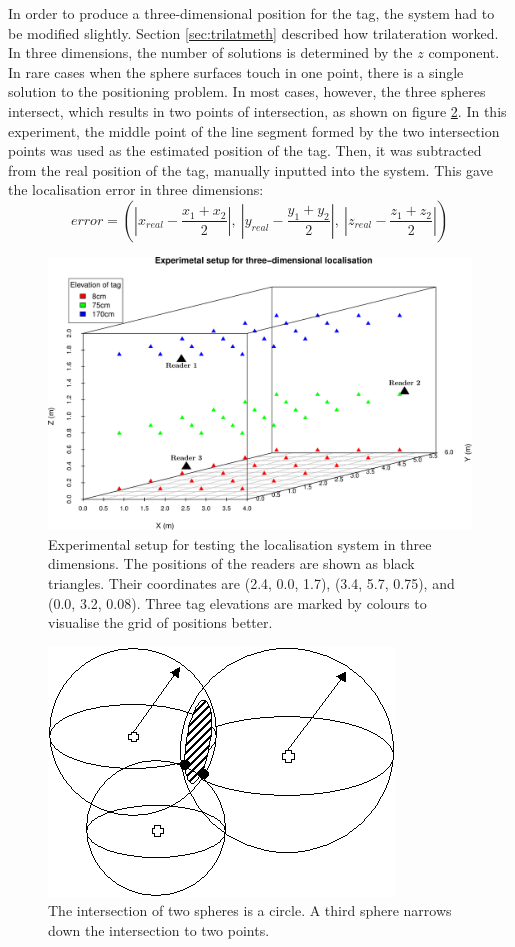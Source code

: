 In order to produce a three-dimensional position for the tag, the system had to be modified slightly. Section \ref{sec:trilatmeth} described how trilateration worked. In three dimensions, the number of solutions is determined by the $z$ component. In rare cases when the sphere surfaces touch in one point, there is a single solution to the positioning problem. In most cases, however, the three spheres intersect, which results in two points of intersection, as shown on figure \ref{fig:inter}. In this experiment, the middle point of the line segment formed by the two intersection points was used as the estimated position of the tag. Then, it was subtracted from the real position of the tag, manually inputted into the system. This gave the localisation error in three dimensions:
\[error = (|x_{real} - \frac{x_1 + x_2}{2}|, \ |y_{real} - \frac{y_1 + y_2}{2}|, \ |z_{real} - \frac{z_1 + z_2}{2}|)\]
\begin{figure}[H]
	\begin{center}
		\includegraphics[width=1\textwidth]{figures/grid}
		\caption{Experimental setup for testing the localisation system in three dimensions. The positions of the readers are shown as black triangles. Their coordinates are (2.4, 0.0, 1.7), (3.4, 5.7, 0.75), and (0.0, 3.2, 0.08). Three tag elevations are marked by colours to visualise the grid of positions better.}
		\label{fig:lastgrid}
	\end{center}
\end{figure}
\begin{figure}[H]
	\begin{center}
		\includegraphics[width=.35\textwidth]{figures/intersect}
		\caption{The intersection of two spheres is a circle. A third sphere narrows down the intersection to two points\protect\footnotemark.}
		\label{fig:inter}
	\end{center}
\end{figure}

